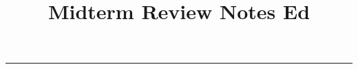 \documentclass[12pt, twoside, exarticle]{article}
\title{\textbf{Midterm Review Notes Ed \docbuild}}
\begin{document}

\makeatletter
\hfil\parbox[t]{0.7\textwidth}{\centering\LARGE\bfseries\@title}\par
\kern0.5cm \hrule\kern0.5cm
\makeatother



\thispagestyle{empty}




\clearpage


\thispagestyle{empty}




\clearpage


\thispagestyle{empty}

\renewcommand{\contentsname}{Table of Contents}

\tableofcontents
\end{document}
